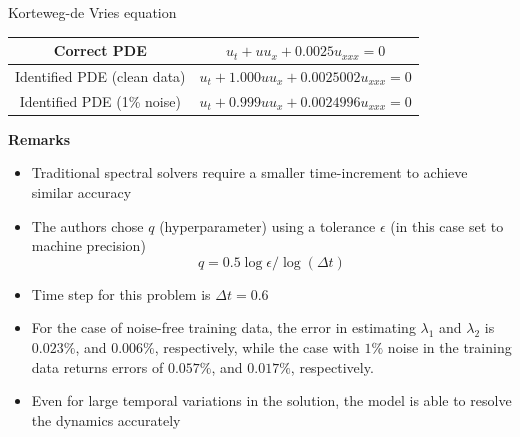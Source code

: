 \documentclass[xcolor=dvipsnames,10pt]{beamer}
\begin{document}
\begin{frame}[t]{Korteweg-de Vries equation}
  \begin{table}
    \centering
    \begin{tabular}{|c|c|}
      \hline Correct PDE & $u_{t}+u u_{x}+0.0025 u_{x x x}=0$ \\
      \hline Identified PDE (clean data) & $u_{t}+1.000 u u_{x}+0.0025002 u_{x x x}=0$ \\
      \hline Identified PDE (1\% noise) & $u_{t}+0.999 u u_{x}+0.0024996 u_{x x x}=0$ \\
      \hline
      \end{tabular}
  \end{table}

  {\bf Remarks}

  \begin{itemize}
    \item<2-> Traditional spectral solvers require a smaller time-increment to achieve similar accuracy
    \item<3-> The authors chose $q$ (hyperparameter) using a tolerance $\epsilon$ (in this case set to machine precision)
    $$
      q=0.5 \log \epsilon / \log (\Delta t)
    $$
    \item<4-> Time step for this problem is $\Delta t = 0.6$
    \item<5-> For the case of noise-free training data, the error in estimating $\lambda_{1}$ and $\lambda_{2}$ is $0.023 \%$, and $0.006 \%$, respectively, while the case with $1 \%$ noise in the training data returns errors of $0.057 \%$, and $0.017 \%$, respectively.
    \item<6-> Even for large temporal variations in the solution, the model is able to resolve the dynamics accurately
  \end{itemize}
\end{frame}
\end{document}
